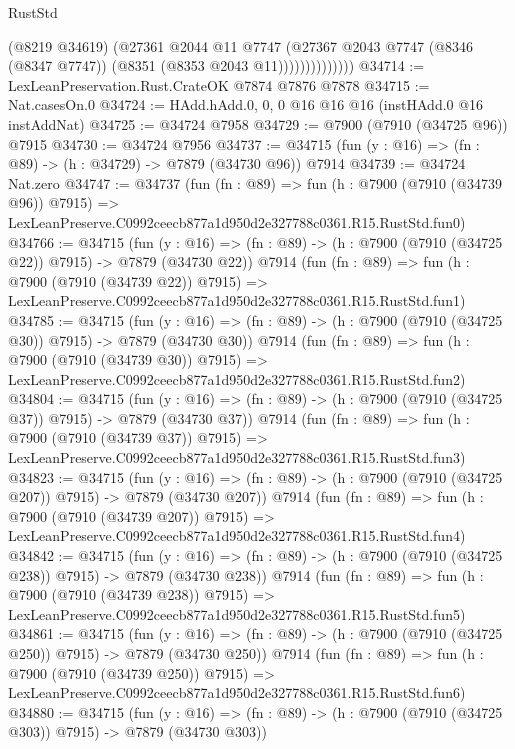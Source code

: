 \begin{lexlean}{RustStd}
\begin{coremodule}
                        (@8219 @34619)
                        (@27361
                          @2044
                          @11
                          @7747
                          (@27367
                            @2043
                            @7747
                            (@8346 (@8347 @7747))
                            (@8351 (@8353 @2043 @11))))))))))))))
@34714 := LexLeanPreservation.Rust.CrateOK @7874 @7876 @7878
@34715 := Nat.casesOn.{0}
@34724 := HAdd.hAdd.{0, 0, 0} @16 @16 @16 (instHAdd.{0} @16 instAddNat)
@34725 := @34724 @7958
@34729 := @7900 (@7910 (@34725 @96)) @7915
@34730 := @34724 @7956
@34737 := @34715 (fun (y : @16) => (fn : @89) -> (h : @34729) -> @7879 (@34730 @96)) @7914
@34739 := @34724 Nat.zero
@34747 := @34737
    (fun (fn : @89) =>
    fun (h : @7900 (@7910 (@34739 @96)) @7915) =>
    LexLeanPreserve.C0992ceecb877a1d950d2e327788c0361.R15.RustStd.fun0)
@34766 := @34715
    (fun (y : @16) => (fn : @89) -> (h : @7900 (@7910 (@34725 @22)) @7915) -> @7879 (@34730 @22))
    @7914
    (fun (fn : @89) =>
    fun (h : @7900 (@7910 (@34739 @22)) @7915) =>
    LexLeanPreserve.C0992ceecb877a1d950d2e327788c0361.R15.RustStd.fun1)
@34785 := @34715
    (fun (y : @16) => (fn : @89) -> (h : @7900 (@7910 (@34725 @30)) @7915) -> @7879 (@34730 @30))
    @7914
    (fun (fn : @89) =>
    fun (h : @7900 (@7910 (@34739 @30)) @7915) =>
    LexLeanPreserve.C0992ceecb877a1d950d2e327788c0361.R15.RustStd.fun2)
@34804 := @34715
    (fun (y : @16) => (fn : @89) -> (h : @7900 (@7910 (@34725 @37)) @7915) -> @7879 (@34730 @37))
    @7914
    (fun (fn : @89) =>
    fun (h : @7900 (@7910 (@34739 @37)) @7915) =>
    LexLeanPreserve.C0992ceecb877a1d950d2e327788c0361.R15.RustStd.fun3)
@34823 := @34715
    (fun (y : @16) => (fn : @89) -> (h : @7900 (@7910 (@34725 @207)) @7915) -> @7879 (@34730 @207))
    @7914
    (fun (fn : @89) =>
    fun (h : @7900 (@7910 (@34739 @207)) @7915) =>
    LexLeanPreserve.C0992ceecb877a1d950d2e327788c0361.R15.RustStd.fun4)
@34842 := @34715
    (fun (y : @16) => (fn : @89) -> (h : @7900 (@7910 (@34725 @238)) @7915) -> @7879 (@34730 @238))
    @7914
    (fun (fn : @89) =>
    fun (h : @7900 (@7910 (@34739 @238)) @7915) =>
    LexLeanPreserve.C0992ceecb877a1d950d2e327788c0361.R15.RustStd.fun5)
@34861 := @34715
    (fun (y : @16) => (fn : @89) -> (h : @7900 (@7910 (@34725 @250)) @7915) -> @7879 (@34730 @250))
    @7914
    (fun (fn : @89) =>
    fun (h : @7900 (@7910 (@34739 @250)) @7915) =>
    LexLeanPreserve.C0992ceecb877a1d950d2e327788c0361.R15.RustStd.fun6)
@34880 := @34715
    (fun (y : @16) => (fn : @89) -> (h : @7900 (@7910 (@34725 @303)) @7915) -> @7879 (@34730 @303))

\end{coremodule}
\end{lexlean}
